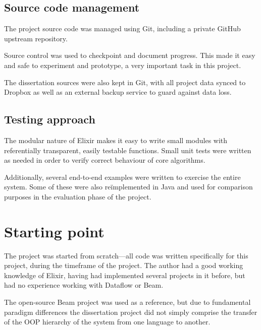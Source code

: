 
\subsection{Source code management}\label{sec:prep:softeng:scm}

The project source code was managed using Git, including a private GitHub upstream repository.

Source control was used to checkpoint and document progress.
This made it easy and safe to experiment and prototype, a very important task in this project.

The dissertation sources were also kept in Git, with all project data synced to Dropbox as well as an external backup service to guard against data loss.

\subsection{Testing approach}\label{sec:prep:softeng:testing}

The modular nature of Elixir makes it easy to write small modules with referentially transparent, easily testable functions.
Small unit tests were written as needed in order to verify correct behaviour of core algorithms.

Additionally, several end-to-end examples were written to exercise the entire system.
Some of these were also re\"implemented in Java and used for comparison purposes in the evaluation phase of the project.

\section{Starting point}\label{sec:prep:starting}

The project was started from scratch---all code was written specifically for this project, during the timeframe of the project.
The author had a good working knowledge of Elixir, having had implemented several projects in it before, but had no experience working with Dataflow or Beam.

The open-source Beam project was used as a reference, but due to fundamental paradigm differences the dissertation project did not simply comprise the transfer of the OOP hierarchy of the system from one language to another.